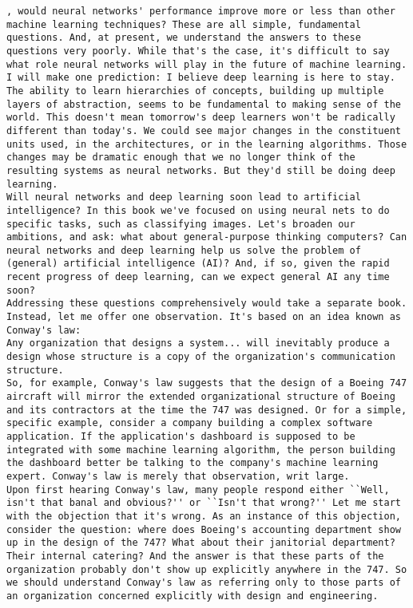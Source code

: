 \begin{lstlisting}
, would neural networks' performance improve more or less than other machine learning techniques? These are all simple, fundamental questions. And, at present, we understand the answers to these questions very poorly. While that's the case, it's difficult to say what role neural networks will play in the future of machine learning.
I will make one prediction: I believe deep learning is here to stay. The ability to learn hierarchies of concepts, building up multiple layers of abstraction, seems to be fundamental to making sense of the world. This doesn't mean tomorrow's deep learners won't be radically different than today's. We could see major changes in the constituent units used, in the architectures, or in the learning algorithms. Those changes may be dramatic enough that we no longer think of the resulting systems as neural networks. But they'd still be doing deep learning.
Will neural networks and deep learning soon lead to artificial intelligence? In this book we've focused on using neural nets to do specific tasks, such as classifying images. Let's broaden our ambitions, and ask: what about general-purpose thinking computers? Can neural networks and deep learning help us solve the problem of (general) artificial intelligence (AI)? And, if so, given the rapid recent progress of deep learning, can we expect general AI any time soon?
Addressing these questions comprehensively would take a separate book. Instead, let me offer one observation. It's based on an idea known as Conway's law: 
Any organization that designs a system... will inevitably produce a design whose structure is a copy of the organization's communication structure. 
So, for example, Conway's law suggests that the design of a Boeing 747 aircraft will mirror the extended organizational structure of Boeing and its contractors at the time the 747 was designed. Or for a simple, specific example, consider a company building a complex software application. If the application's dashboard is supposed to be integrated with some machine learning algorithm, the person building the dashboard better be talking to the company's machine learning expert. Conway's law is merely that observation, writ large.
Upon first hearing Conway's law, many people respond either ``Well, isn't that banal and obvious?'' or ``Isn't that wrong?'' Let me start with the objection that it's wrong. As an instance of this objection, consider the question: where does Boeing's accounting department show up in the design of the 747? What about their janitorial department? Their internal catering? And the answer is that these parts of the organization probably don't show up explicitly anywhere in the 747. So we should understand Conway's law as referring only to those parts of an organization concerned explicitly with design and engineering.

\end{lstlisting}
